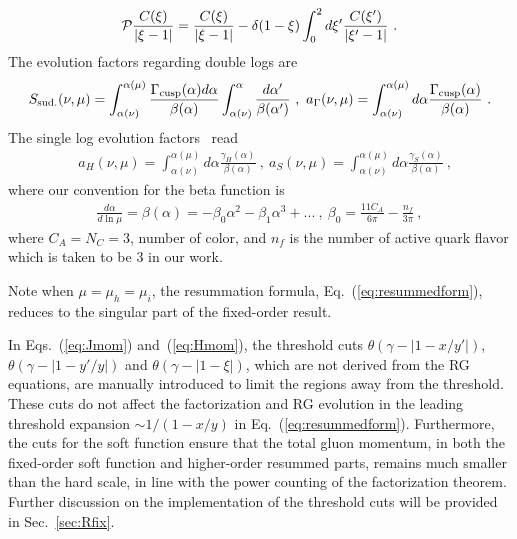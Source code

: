 \documentclass[a4paper,11pt]{article}
\begin{document}
\begin{align}\label{eq:plusPV}
{\cal P} \frac{C(\xi)}{|\xi-1|} = \frac{C(\xi)}{|\xi-1|} - \delta(1-\xi) \int_{0}^{2} d\xi' \frac{C(\xi')}{|\xi'-1|}   \ .
\end{align}
The evolution factors regarding double logs are
\begin{align}\label{eq:aGamma}
  S_{\rm sud.}(\nu,\mu)=\int_{\alpha(\nu)}^{\alpha(\mu)}\frac{\Gamma_{\rm cusp}(\alpha)d\alpha}{\beta(\alpha)}\int_{\alpha(\nu)}^{\alpha}\frac{d\alpha'}{\beta(\alpha')} \ , \   a_{\rm \Gamma}(\nu,\mu)=\int_{\alpha(\nu)}^{\alpha(\mu)} d\alpha\frac{\Gamma_{\rm cusp}(\alpha)}{\beta(\alpha)} \ .
\end{align}
The single log evolution factors~\cite{Becher:2006mr} read
\begin{align}\label{eq:othera}
&  a_{H}(\nu,\mu)=\int_{\alpha(\nu)}^{\alpha(\mu)} d\alpha\frac{  \gamma_H(\alpha)}{\beta(\alpha)} \ ,  \ 
  a_{S}(\nu,\mu)=\int_{\alpha(\nu)}^{\alpha(\mu)} d\alpha\frac{  \gamma_{S}(\alpha)}{\beta(\alpha)} \ ,
\end{align} 
where our convention for the beta function is 
\begin{align}\label{eq:beta}
    \frac{d\alpha}{d\ln \mu}= \beta(\alpha) =-\beta_0 \alpha^2 - \beta_1 \alpha^3 +... \ ,  \ 
    \beta_0=\frac{11C_A}{6\pi}-\frac{n_f}{3\pi} \ ,
\end{align}
where $C_A=N_C=3$, number of color, and $n_f$ is the number of active quark flavor which is taken to be 3 in our work.

Note when $\mu=\mu_h=\mu_i$, the resummation formula, Eq.~(\ref{eq:resummedform}), reduces to the singular part of the fixed-order result. 

In Eqs.~(\ref{eq:Jmom}) and~(\ref{eq:Hmom}), the threshold cuts $\theta\left(\gamma-\left|1-x/y'\right|\right)$, $\theta\left(\gamma-\left|1-y'/y\right|\right)$ and $\theta\left(\gamma-\left|1-\xi\right|\right)$, which are not derived from the RG equations, are manually introduced to limit the regions away from the threshold. These cuts do not affect the factorization and RG evolution in the leading threshold expansion $\sim 1/(1-x/y)$ in Eq.~(\ref{eq:resummedform}). Furthermore, the cuts for the soft function ensure that the total gluon momentum, in both the fixed-order soft function and higher-order resummed parts, remains much smaller than the hard scale, in line with the power counting of the factorization theorem. Further discussion on the implementation of the threshold cuts will be provided in Sec.~\ref{sec:Rfix}.
\end{document}
